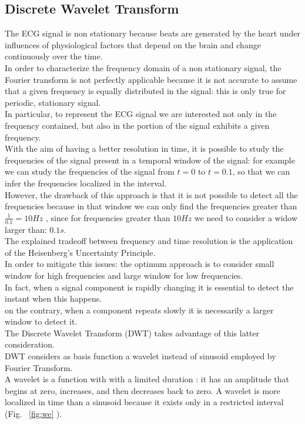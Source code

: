 \documentclass[LaM,binding=0.6cm]{sapthesis}
\begin{document}
\subsection{Discrete Wavelet Transform}
The ECG signal is non stationary because beats are generated by the heart under influences of physiological factors that depend on the brain and change continuously over the time.\\In order to characterize the frequency domain of a non stationary signal, the Fourier transform is not perfectly applicable because it is not accurate to assume that a given frequency is equally distributed in the signal: this is only true for periodic, stationary signal.\\In particular, to represent the ECG signal we are interested not only in the frequency contained, but also in the portion of the signal exhibits a given frequency.\\With the aim of having a better resolution in time, it is possible to study the frequencies of the signal present in a temporal window of the signal: for example we can study the frequencies of the signal from $t=0$ to $t=0.1$, so that we can infer the frequencies localized in the interval.\\However, the drawback of this approach is that it is not possible to detect all the frequencies because in that window we can only find the frequencies greater than $\frac{1}{0.1}=10 Hz$ , since for frequencies greater than $10 Hz$ we need to consider a widow larger than: $0.1s$.\\The explained tradeoff between frequency and time resolution is the application of the Heisenberg's Uncertainty Principle.\\In order to mitigate this issues: the optimum approach is to consider small window for high frequencies and large window for low frequencies.\\In fact, when a signal component is rapidly changing it is essential to detect the instant when this happens.\\on the contrary, when a component repeats slowly it is necessarily a larger window to detect it.\\The Discrete Wavelet Transform (DWT) takes advantage of this latter consideration.\\DWT considers as basis function a wavelet instead of sinusoid employed by Fourier Transform.\\A wavelet is a function with with a limited duration : it has an amplitude that begins at zero, increases, and then decreases back to zero. A wavelet is more localized in time than a sinusoid because it exists only in a restricted interval (Fig. ~\ref{fig:we} ). 
\end{document}
